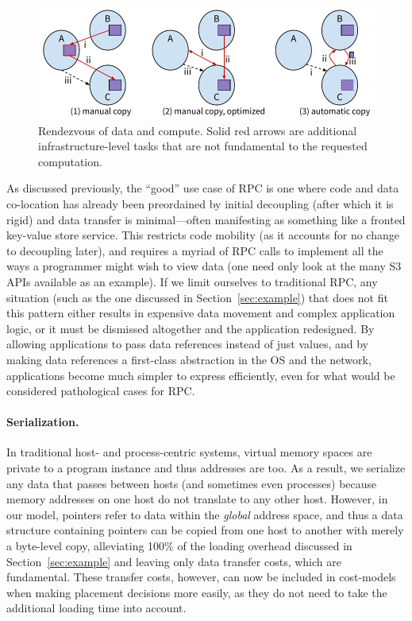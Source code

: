 {    \begin{figure}
        \centering
        \includegraphics[width=0.9\columnwidth]{fig/copy}
        \vspace*{-5mm}
        \caption{Rendezvous of data and compute. Solid red arrows are additional
            infrastructure-level tasks that are not fundamental to the requested computation.}
        \label{fig:rpccopy}
        \vspace*{-4mm}
    \end{figure}

    As discussed previously, the ``good'' use case of RPC is one where code and data
    co-location has already been preordained by initial decoupling (after which it is rigid) and
    data transfer is minimal---often manifesting as something like a fronted key-value store service. This restricts
    code mobility (as it accounts for no change to decoupling later), and requires a myriad of RPC calls
    to implement all the ways a programmer might wish to view data (one need only look at the many S3
    APIs available as an example).
    If we limit ourselves to traditional RPC, any situation (such as the one discussed in
    Section~\ref{sec:example}) that does not fit this pattern either results in expensive data movement
    and complex application logic, or it must be dismissed altogether and the application redesigned.
    By allowing applications to pass data references instead of just values, and by making data
    references a first-class abstraction in the OS and the network, applications become much simpler to
    express efficiently, even for what would be considered pathological cases for RPC.

    \paragraph*{Serialization.}
    In traditional host- and process-centric systems, virtual memory spaces are private to a
    program instance and thus addresses are too. As a result, we serialize any data that passes between
    hosts (and sometimes even processes) because memory addresses on one host do not translate to any
    other host. However, in our model, pointers refer to data within the \emph{global} address space,
    and thus a data structure containing pointers can be copied from one host to another with merely a
    byte-level copy, alleviating 100\% of the loading overhead discussed in Section~\ref{sec:example}
    and leaving only data transfer costs, which are fundamental. These transfer costs, however, can now
    be included in cost-models when making placement decisions more easily, as they do not need to take
    the additional loading time into account.

}


